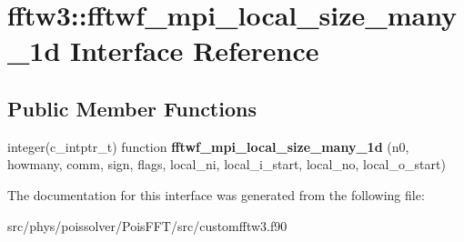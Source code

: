 \hypertarget{interfacefftw3_1_1fftwf__mpi__local__size__many__1d}{}\section{fftw3\+:\+:fftwf\+\_\+mpi\+\_\+local\+\_\+size\+\_\+many\+\_\+1d Interface Reference}
\label{interfacefftw3_1_1fftwf__mpi__local__size__many__1d}
\subsection*{Public Member Functions}
\begin{DoxyCompactItemize}
\item 
integer(c\+\_\+intptr\+\_\+t) function {\bfseries fftwf\+\_\+mpi\+\_\+local\+\_\+size\+\_\+many\+\_\+1d} (n0, howmany, comm, sign, flags, local\+\_\+ni, local\+\_\+i\+\_\+start, local\+\_\+no, local\+\_\+o\+\_\+start)\hypertarget{interfacefftw3_1_1fftwf__mpi__local__size__many__1d_a05cf549a1548d2c04002810bae39e113}{}\label{interfacefftw3_1_1fftwf__mpi__local__size__many__1d_a05cf549a1548d2c04002810bae39e113}

\end{DoxyCompactItemize}


The documentation for this interface was generated from the following file\+:\begin{DoxyCompactItemize}
\item 
src/phys/poissolver/\+Pois\+F\+F\+T/src/customfftw3.\+f90\end{DoxyCompactItemize}
